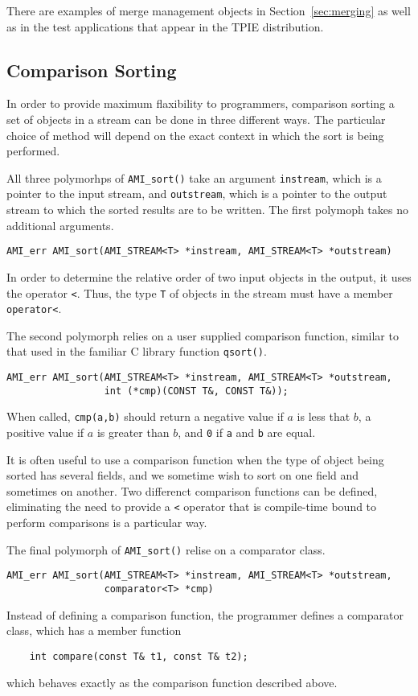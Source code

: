 There are examples of merge management objects in
Section~\ref{sec:merging} as well as in the test applications that
appear in the TPIE distribution.

\subsection{Comparison Sorting}
\label{sec:ref-ami-sort}


In order to provide maximum flaxibility to programmers, comparison
sorting a set of objects in a stream can be done in three different
ways.  The particular choice of method will depend on the exact
context in which the sort is being performed.

All three polymorhps of \verb|AMI_sort()| take an argument
\verb|instream|, which is a pointer to the input stream, and
\verb|outstream|, which is a pointer to the output stream to which the
sorted results are to be written.
The first polymoph takes no additional arguments.  
\begin{verbatim}
AMI_err AMI_sort(AMI_STREAM<T> *instream, AMI_STREAM<T> *outstream)
\end{verbatim}
In order to
determine the relative order of two input objects in the output, it
uses the operator \verb|<|.  Thus, the type \verb|T| of objects in the
stream must have a member \verb|operator<|. 

The second polymorph relies on a user supplied comparison function,
similar to that used in the familiar C library function \verb|qsort()|.
\begin{verbatim}
AMI_err AMI_sort(AMI_STREAM<T> *instream, AMI_STREAM<T> *outstream,
                 int (*cmp)(CONST T&, CONST T&));
\end{verbatim}
When called, \verb|cmp(a,b)| should return a negative value if $a$ is
less that $b$, a positive value if $a$ is greater than $b$, and
\verb|0| if \verb|a| and \verb|b| are equal.

It is often useful to use a comparison function when the type of
object being sorted has several fields, and we sometime wish to sort
on one field and sometimes on another.  Two differenct comparison
functions can be defined, eliminating the need to provide a \verb|<|
operator that is compile-time bound to perform comparisons is a
particular way.

The final polymorph of \verb|AMI_sort()| relise on a comparator class.
\begin{verbatim}
AMI_err AMI_sort(AMI_STREAM<T> *instream, AMI_STREAM<T> *outstream,
                 comparator<T> *cmp)
\end{verbatim}
Instead of defining a comparison function, the programmer defines a
comparator class, which has a member function 
\begin{verbatim}
    int compare(const T& t1, const T& t2);
\end{verbatim}
which behaves exactly as the comparison function described above.


